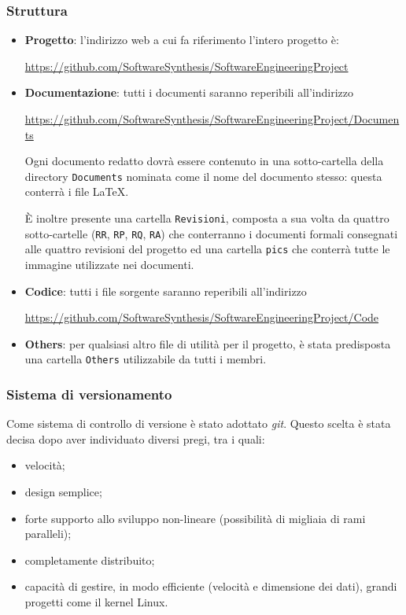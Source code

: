 \subsubsection{Struttura}
\label{sec:struttura}
\begin{itemize}
\item \textbf{Progetto}: l'indirizzo web a cui fa riferimento l'intero progetto è: 
\begin{center}
\url{https://github.com/SoftwareSynthesis/SoftwareEngineeringProject}
\end{center} 
\item \textbf{Documentazione}: tutti i documenti saranno reperibili all'indirizzo
\begin{center}
\url{https://github.com/SoftwareSynthesis/SoftwareEngineeringProject/Documents}
\end{center}
Ogni documento redatto dovrà essere contenuto in una sotto-cartella della directory \verb+Documents+ nominata come il nome del documento stesso: questa conterrà i file \LaTeX.

È inoltre presente una cartella \verb+Revisioni+, composta a sua volta da quattro sotto-cartelle (\verb+RR+, \verb+RP+, \verb+RQ+, \verb+RA+) che conterranno i documenti formali consegnati alle quattro revisioni del progetto ed una cartella \verb+pics+ che conterrà tutte le immagine utilizzate nei documenti.
\item \textbf{Codice}: tutti i file sorgente saranno reperibili all'indirizzo
\begin{center}
\url{https://github.com/SoftwareSynthesis/SoftwareEngineeringProject/Code}
\end{center}
\item \textbf{Others}: per qualsiasi altro file di utilità per il progetto, è stata predisposta una cartella \verb+Others+ utilizzabile da tutti i membri.
\end{itemize}

\subsubsection{Sistema di versionamento}
Come sistema di controllo di versione  è stato adottato \textit{git}. Questo scelta è stata decisa dopo aver individuato diversi pregi, tra i quali:
\begin{itemize}
\item velocità;
\item design semplice;
\item forte supporto allo sviluppo non-lineare (possibilità di migliaia di rami paralleli);
\item completamente distribuito;
\item capacità di gestire, in modo efficiente (velocità e dimensione dei dati), grandi progetti come il kernel Linux.
\end{itemize}

